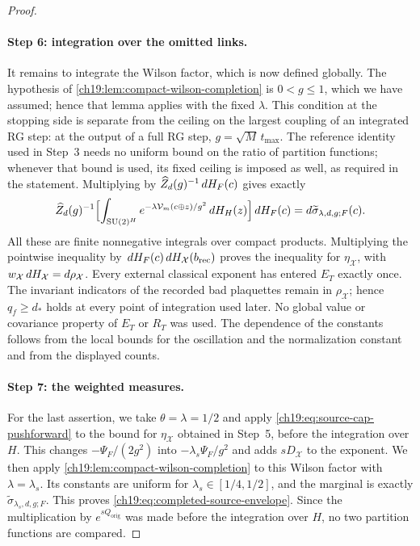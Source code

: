 \begin{proof}
\paragraph{Step 6: integration over the omitted links.}
It remains to integrate the Wilson factor, which is now defined globally. The hypothesis of \cref{ch19:lem:compact-wilson-completion} is $0<g\le1$, which we have assumed; hence that lemma applies with the fixed $\lambda$. This condition at the stopping side is separate from the ceiling on the largest coupling of an integrated RG step: at the output of a full RG step, $g=\sqrt M\,t_{\max}$. The reference identity used in Step~3 needs no uniform bound on the ratio of partition functions; whenever that bound is used, its fixed ceiling is imposed as well, as required in the statement. Multiplying by $\widehat Z_d(g)^{-1}\,dH_F(c)$ gives exactly
\[
 \widehat Z_d(g)^{-1}\Bigl[\int_{\mathrm{SU}(2)^H}e^{-\lambda\mathcal V_m(c\oplus z)/g^2}\,dH_H(z)\Bigr]\,dH_F(c)=d\widetilde\sigma_{\lambda,d,g;F}(c).
\]
All these are finite nonnegative integrals over compact products. Multiplying the pointwise inequality by $\,dH_F(c)\,dH_{\mathcal X}(b_{\mathrm{rec}})$ proves the inequality for $\eta_{\mathcal X}$, with $w_{\mathcal X}\,dH_{\mathcal X}=d\rho_{\mathcal X}$. Every external classical exponent has entered $E_T$ exactly once. The invariant indicators of the recorded bad plaquettes remain in $\rho_{\mathcal X}$; hence $q_f\ge d_*$ holds at every point of integration used later. No global value or covariance property of $E_T$ or $R_T$ was used. The dependence of the constants follows from the local bounds for the oscillation and the normalization constant and from the displayed counts.

\paragraph{Step 7: the weighted measures.}
For the last assertion, we take $\theta=\lambda=1/2$ and apply \eqref{ch19:eq:source-cap-pushforward} to the bound for $\eta_{\mathcal X}$ obtained in Step~5, before the integration over $H$. This changes $-\Psi_F/(2g^2)$ into $-\lambda_s\Psi_F/g^2$ and adds $sD_{\mathcal X}$ to the exponent. We then apply \cref{ch19:lem:compact-wilson-completion} to this Wilson factor with $\lambda=\lambda_s$. Its constants are uniform for $\lambda_s\in[1/4,1/2]$, and the marginal is exactly $\widetilde\sigma_{\lambda_s,d,g;F}$. This proves \eqref{ch19:eq:completed-source-envelope}. Since the multiplication by $e^{sQ_{\mathrm{orig}}}$ was made before the integration over $H$, no two partition functions are compared.
\end{proof}

